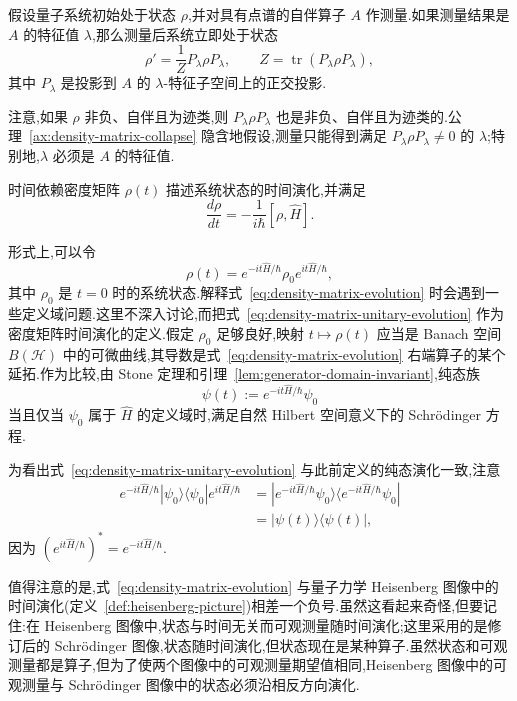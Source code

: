 \begin{axiom}[测量后的状态]\label{ax:density-matrix-collapse}
假设量子系统初始处于状态 $\rho$,并对具有点谱的自伴算子 $A$ 作测量.如果测量结果是 $A$ 的特征值 $\lambda$,那么测量后系统立即处于状态
\[
 \rho'=\frac1ZP_\lambda\rho P_\lambda,
\qquad
 Z=\operatorname{tr}(P_\lambda\rho P_\lambda),
\]
其中 $P_\lambda$ 是投影到 $A$ 的 $\lambda$-特征子空间上的正交投影.
\end{axiom}

注意,如果 $\rho$ 非负、自伴且为迹类,则 $P_\lambda\rho P_\lambda$ 也是非负、自伴且为迹类的.公理~\ref{ax:density-matrix-collapse} 隐含地假设,测量只能得到满足 $P_\lambda\rho P_\lambda\ne0$ 的 $\lambda$;特别地,$\lambda$ 必须是 $A$ 的特征值.

\begin{axiom}[密度矩阵的时间演化]\label{ax:density-matrix-evolution}
时间依赖密度矩阵 $\rho(t)$ 描述系统状态的时间演化,并满足
\[
 \frac{d\rho}{dt}=-\frac1{i\hbar}[\rho,\widehat H].\label{eq:density-matrix-evolution}
\]
\end{axiom}

形式上,可以令
\[
 \rho(t)=e^{-it\widehat H/\hbar}\rho_0e^{it\widehat H/\hbar},\label{eq:density-matrix-unitary-evolution}
\]
其中 $\rho_0$ 是 $t=0$ 时的系统状态.解释式~\eqref{eq:density-matrix-evolution} 时会遇到一些定义域问题.这里不深入讨论,而把式~\eqref{eq:density-matrix-unitary-evolution} 作为密度矩阵时间演化的定义.假定 $\rho_0$ 足够良好,映射 $t\mapsto\rho(t)$ 应当是 Banach 空间 $B(\mathcal H)$ 中的可微曲线,其导数是式~\eqref{eq:density-matrix-evolution} 右端算子的某个延拓.作为比较,由 Stone 定理和引理~\ref{lem:generator-domain-invariant},纯态族
\[
 \psi(t):=e^{-it\widehat H/\hbar}\psi_0
\]
当且仅当 $\psi_0$ 属于 $\widehat H$ 的定义域时,满足自然 Hilbert 空间意义下的 Schrödinger 方程.

为看出式~\eqref{eq:density-matrix-unitary-evolution} 与此前定义的纯态演化一致,注意
\[
\begin{aligned}
 e^{-it\widehat H/\hbar}|\psi_0\rangle\langle\psi_0|e^{it\widehat H/\hbar}
 &=|e^{-it\widehat H/\hbar}\psi_0\rangle
 \langle e^{-it\widehat H/\hbar}\psi_0|\\
 &=|\psi(t)\rangle\langle\psi(t)|,
\end{aligned}
\]
因为 $(e^{it\widehat H/\hbar})^*=e^{-it\widehat H/\hbar}$.

值得注意的是,式~\eqref{eq:density-matrix-evolution} 与量子力学 Heisenberg 图像中的时间演化(定义~\ref{def:heisenberg-picture})相差一个负号.虽然这看起来奇怪,但要记住:在 Heisenberg 图像中,状态与时间无关而可观测量随时间演化;这里采用的是修订后的 Schrödinger 图像,状态随时间演化,但状态现在是某种算子.虽然状态和可观测量都是算子,但为了使两个图像中的可观测量期望值相同,Heisenberg 图像中的可观测量与 Schrödinger 图像中的状态必须沿相反方向演化.

